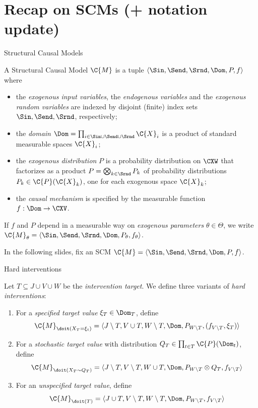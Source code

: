 \part{Recap on SCMs (+ notation update)}
\frame{\partpage}

\begin{frame}{Structural Causal Models}
  \begin{definition}
  A Structural Causal Model $\C{M}$ is a tuple $\langle \Sin, \Send, \Srnd, \Dom, P, f \rangle$ 
  where
  \begin{itemize}
    \item the \emph{exogenous input variables}, the \emph{endogenous variables} and the \emph{exogenous random variables} are indexed by disjoint (finite) index sets $\Sin, \Send, \Srnd$, respectively;
    \item the \emph{domain} $\Dom = \prod_{i\in \Sin \cup \Send \cup \Srnd} \C{X}_i$ is a product of standard measurable spaces $\C{X}_i$;
    \item the \emph{exogenous distribution} $P$ is a probability distribution on $\CXW$ that factorizes as a product $P = \bigotimes_{k\in\Srnd} P_k$ of probability distributions $P_k \in \C{P}(\C{X}_k)$, one for each exogenous space $\C{X}_k$;
    \item the \emph{causal mechanism} is specified by the measurable function $f : \Dom \to \CXV$.
  \end{itemize}
If $f$ and $P$ depend in a measurable way on \emph{exogenous parameters} $\theta\in\Theta$, 
we write $\C{M}_{\theta} = \langle \Sin, \Send, \Srnd, \Dom, P_{\theta}, f_{\theta} \rangle$.
\end{definition}
In the following slides, fix an SCM $\C{M} = \langle \Sin, \Send, \Srnd, \Dom, P, f \rangle$.
\end{frame}

\begin{frame}{Hard interventions}
  \begin{definition}
  Let $T \subseteq J \cup V \cup W$ be the \emph{intervention target}. We define three variants of \emph{hard interventions}:
    \begin{enumerate}
      \item For a \emph{specified target value} $\xi_T \in \Dom_T$, define
    $$\C{M}_{\doit(X_T=\xi_t)} = \langle J\setminus T, V \cup T, W \setminus T, \Dom, P_{W\setminus T}, (f_{V\setminus T},\xi_T)\rangle$$
  \item For a \emph{stochastic target value} with distribution $Q_T \in \prod_{t\in T} \C{P}(\Dom_t)$, define
    $$\C{M}_{\doit(X_T\sim Q_T)} = \langle J\setminus T, V \setminus T, W \cup T, \Dom, P_{W\setminus T} \otimes Q_T, f_{V\setminus T}\rangle$$
  \item For an \emph{unspecified target value}, define
    $$\C{M}_{\doit(T)} = \langle J\cup T, V\setminus T, W \setminus T, \Dom, P_{W\setminus T}, f_{V\setminus T} \rangle$$
    \end{enumerate}
  \end{definition}
\end{frame}

